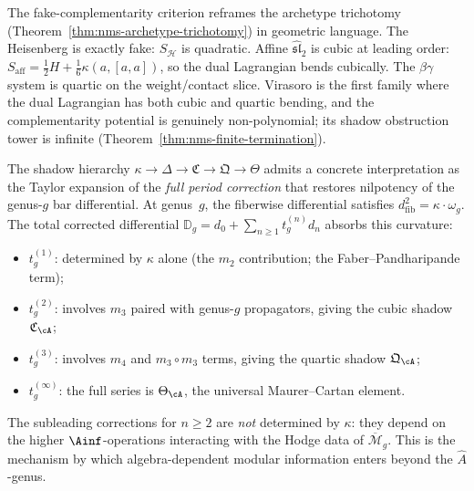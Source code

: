 \begin{remark}
\label{rem:three-archetypes-lagrangian}
The fake-complementarity criterion reframes the archetype trichotomy
(Theorem~\ref{thm:nms-archetype-trichotomy}) in geometric language.
The Heisenberg is exactly fake: $S_{\mathcal{H}}$ is quadratic.
Affine $\widehat{\mathfrak{sl}}_2$ is cubic at leading order:
$S_{\mathrm{aff}} = \tfrac12 H + \tfrac16\kappa(a,[a,a])$,
so the dual Lagrangian bends cubically. The $\beta\gamma$ system is
quartic on the weight/contact slice. Virasoro is the first family
where the dual Lagrangian has both cubic and quartic bending,
and the complementarity potential is genuinely non-polynomial; its
shadow obstruction tower is infinite (Theorem~\ref{thm:nms-finite-termination}).
\end{remark}

\begin{remark}
\label{rem:shadow-tower-period-correction}
The shadow hierarchy
$\kappa \to \Delta \to \mathfrak{C}
\to \mathfrak{Q} \to \Theta$
admits a concrete interpretation as the Taylor expansion of the
\emph{full period correction} that restores nilpotency of the
genus-$g$ bar differential. At genus~$g$, the fiberwise
differential satisfies $d_{\mathrm{fib}}^2 = \kappa \cdot \omega_g$.
The total corrected differential
$\mathbb{D}_g = d_0 + \sum_{n \geq 1} t_g^{(n)} d_n$
absorbs this curvature:
\begin{itemize}
\item $t_g^{(1)}$: determined by $\kappa$ alone (the $m_2$
 contribution; the Faber--Pandharipande term);
\item $t_g^{(2)}$: involves $m_3$ paired with genus-$g$ propagators,
 giving the cubic shadow $\mathfrak{C}_{\cA}$;
\item $t_g^{(3)}$: involves $m_4$ and $m_3 \circ m_3$ terms,
 giving the quartic shadow $\mathfrak{Q}_{\cA}$;
\item $t_g^{(\infty)}$: the full series is $\Theta_{\cA}$,
 the universal Maurer--Cartan element.
\end{itemize}
The subleading corrections for $n \geq 2$ are \emph{not} determined
by $\kappa$: they depend on the higher $\Ainf$-operations interacting
with the Hodge data of $\overline{\mathcal{M}}_g$. This is the
mechanism by which algebra-dependent modular information enters
beyond the $\hat{A}$-genus.
\end{remark}

